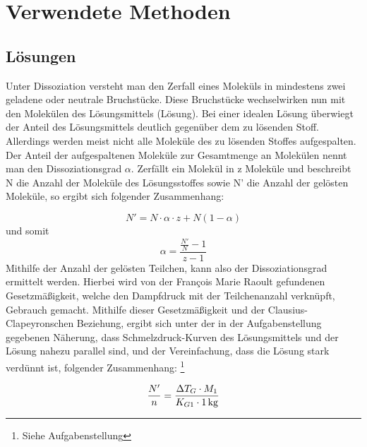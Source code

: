 \section{Verwendete Methoden}
\subsection{Lösungen}
Unter Dissoziation versteht man den Zerfall eines Moleküls in mindestens zwei geladene oder neutrale Bruchstücke. Diese Bruchstücke wechselwirken nun mit den Molekülen des Lösungsmittels (Lösung). Bei einer idealen Lösung überwiegt der Anteil des Lösungsmittels deutlich gegenüber dem zu lösenden Stoff. Allerdings werden meist nicht alle Moleküle des zu lösenden Stoffes aufgespalten. Der Anteil der aufgespaltenen Moleküle zur Gesamtmenge an Molekülen nennt man den Dissoziationsgrad $\alpha$. Zerfällt ein Molekül in z Moleküle und beschreibt N die Anzahl der Moleküle des Lösungsstoffes sowie N' die Anzahl der gelösten Moleküle, so ergibt sich folgender Zusammenhang:

\begin{equation}
N' = N \cdot \alpha \cdot z + N(1-\alpha) \label{eq:N'}
\end{equation}
und somit
\begin{equation}
\alpha = \frac{\frac{N'}{N}-1}{z-1} \label{eq:alpha}
\end{equation}
%
Mithilfe der Anzahl der gelösten Teilchen, kann also der Dissoziationsgrad ermittelt werden. Hierbei wird von der  François Marie Raoult gefundenen Gesetzmäßigkeit, welche den Dampfdruck mit der Teilchenanzahl verknüpft, Gebrauch gemacht. Mithilfe dieser Gesetzmäßigkeit und der Clausius-Clapeyronschen Beziehung, ergibt sich unter der in der Aufgabenstellung gegebenen Näherung, dass Schmelzdruck-Kurven des Lösungsmittels und der Lösung nahezu parallel sind, und der Vereinfachung, dass die Lösung stark verdünnt ist, folgender Zusammenhang: \footnote{Siehe Aufgabenstellung}

\begin{equation}
\frac{N'}{n} = \frac{\Delta T_G \cdot M_1}{K_{G1} \cdot \unit[1]{kg}}
\end{equation}

